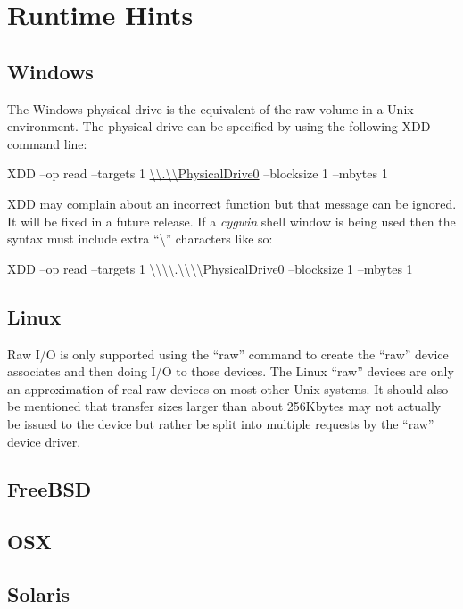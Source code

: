 \newpage
\section{Runtime Hints}\label{runtime-hints}

\subsection{Windows}\label{windows}

The Windows physical drive is the equivalent of the raw volume in a Unix environment. The physical drive can be specified by using the following XDD command line:

XDD --op read --targets 1 \href{file://///.//PhysicalDrive0}{\textbackslash\textbackslash.\textbackslash\textbackslash PhysicalDrive0} --blocksize 1 --mbytes 1

XDD may complain about an incorrect function but that message can be ignored. It will be fixed in a future release. If a \emph{cygwin} shell window is being used then the syntax must include extra ``\textbackslash'' characters like so:

XDD --op read --targets 1 \textbackslash\textbackslash\textbackslash\textbackslash.\textbackslash\textbackslash\textbackslash\textbackslash PhysicalDrive0 --blocksize 1 --mbytes 1

\subsection{Linux}\label{linux-1}

Raw I/O is only supported using the ``raw'' command to create the ``raw'' device associates and then doing I/O to those devices. The Linux ``raw'' devices are only an approximation of real raw devices on most other Unix systems. It should also be mentioned that transfer sizes larger than about 256Kbytes may not actually be issued to the device but rather be split into multiple requests by the ``raw'' device driver.

\subsection{FreeBSD}\label{freebsd}

\subsection{OSX}\label{osx}

\subsection{Solaris}\label{solaris}

